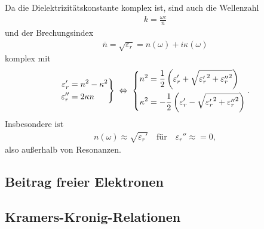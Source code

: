 Da die Dielektrizitätskonstante komplex ist, sind auch die Wellenzahl
\begin{align*}
    k=\frac{\omega c}{\overline{n}}
\end{align*}
und der Brechungsindex
\begin{align*}
    \overline{n} = \sqrt{\varepsilon_r}=n(\omega)+i\kappa(\omega)
\end{align*}
komplex mit
\begin{align*}
    \left.
    \begin{aligned}
        \varepsilon_r'  & = n^2-\kappa^2 \\
        \varepsilon_r'' & = 2\kappa n
    \end{aligned}
    \right\} \;\Leftrightarrow\; \left\{
    \begin{aligned}
        n^2      & = \frac{1}{2}\left(\varepsilon_r'+\sqrt{{\varepsilon_r'}^2+{\varepsilon_r''}^2}\right)  \\
        \kappa^2 & = -\frac{1}{2}\left(\varepsilon_r'-\sqrt{{\varepsilon_r'}^2+{\varepsilon_r''}^2}\right)
    \end{aligned}
    \right..
\end{align*}
Insbesondere ist
\begin{align*}
    n(\omega) \approx \sqrt{\varepsilon_r'} \quad \text{für} \quad \varepsilon_r'' \approx=0,
\end{align*}
also außerhalb von Resonanzen.








\subsection{Beitrag freier Elektronen\label{sec:freie_elektronen}}
\subsection{Kramers-Kronig-Relationen\label{sec:kramers_kronig_relation}}
